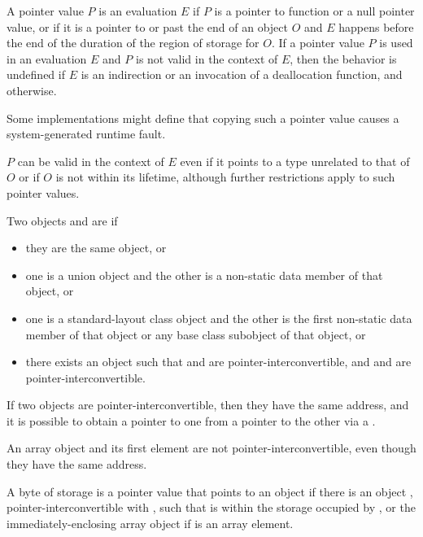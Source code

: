 \pnum
A pointer value $P$ is
%
 an evaluation $E$
if $P$ is a pointer to function or a null pointer value, or
if it is a pointer to or past the end of an object $O$ and
$E$ happens before the end of the duration of the region of storage for $O$.
If a pointer value $P$ is used in an evaluation $E$ and
$P$ is not valid in the context of $E$,
then the behavior is undefined if $E$ is
an indirection or
an invocation of a deallocation function,
and  otherwise.
\begin{footnote}
Some implementations might define that
copying such a pointer value causes a system-generated runtime fault.
\end{footnote}
\begin{note}
$P$ can be valid in the context of $E$ even
if it points to a type unrelated to that of $O$ or
if $O$ is not within its lifetime,
although further restrictions apply
to such pointer values.
\end{note}

\pnum
Two objects  and  are  if
\begin{itemize}
\item
they are the same object, or
\item
one is a union object and
the other is a non-static data member of that object, or
\item
one is a standard-layout class object and
the other is the first non-static data member of that object or
any base class subobject of that object, or
\item
there exists an object  such that
 and  are pointer-interconvertible, and
 and  are pointer-interconvertible.
\end{itemize}
If two objects are pointer-interconvertible,
then they have the same address,
and it is possible to obtain a pointer to one
from a pointer to the other
via a .
\begin{note}
An array object and its first element are not pointer-interconvertible,
even though they have the same address.
\end{note}

\pnum
A byte of storage 
is 
a pointer value that points to an object 
if there is an object ,
pointer-interconvertible with ,
such that  is within the storage occupied by
, or the immediately-enclosing array object
if  is an array element.

